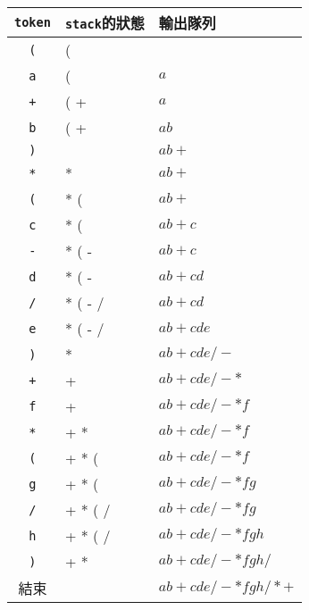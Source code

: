 \documentclass[12pt,a4paper]{article}
\begin{document}
\newcommand{\tok}[1]{\texttt{#1}}

\begin{tabular}{|c|>{\raggedright}p{5cm}|>{\raggedright\arraybackslash}p{6cm}|}
\hline
\texttt{token} & \texttt{stack}的狀態 & 輸出隊列 \\
\hline
\tok{(}   & (                         &                              \\
\tok{a}   & (                         & $a$                          \\
\tok{+}   & ( +                       & $a$                          \\
\tok{b}   & ( +                       & $a b$                   \\
\tok{)}   &                           & $a b +$            \\
\tok{*}   & *                         & $a b +$            \\
\tok{(}   & * (                       & $a b +$            \\
\tok{c}   & * (                       & $a b + c$     \\
\tok{-}   & * ( -                     & $a b + c$     \\
\tok{d}   & * ( -                     & $a b + c d$ \\
\tok{/}   & * ( - /                   & $a b + c d$ \\
\tok{e}   & * ( - /                   & $a b + c d e$ \\
\tok{)}   & *                         & $a b + c d e / -$ \\
\tok{+}   & +                         & $a b + c d e / - *$ \\
\tok{f}   & +                         & $a b + c d e / - * f$ \\
\tok{*}   & + *                       & $a b + c d e / - * f$ \\
\tok{(}   & + * (                     & $a b + c d e / - * f$ \\
\tok{g}   & + * (                     & $a b + c d e / - * f g$ \\
\tok{/}   & + * ( /                   & $a b + c d e / - * f g$ \\
\tok{h}   & + * ( /                   & $a b + c d e / - * f g h$ \\
\tok{)}   & + *                       & $a b + c d e / - * f g h / $ \\
結束 &                        & $a b + c d e / - * f g h / * +$ \\
\hline
\end{tabular}
\end{document}
